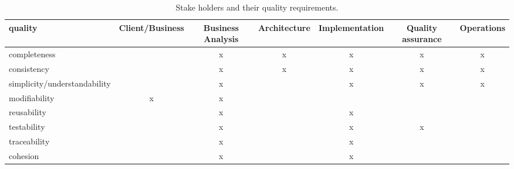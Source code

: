 \begin{table*}[htb]
  \caption{Stake holders and their quality requirements. \label{tab:requirements}}
	{\small
  \begin{tabular}{|l||c|c|c|c|c|c|}
    \hline
	{\bf quality} & Client/Business & Business Analysis & Architecture & Implementation & Quality assurance & Operations \\ \hline
	completeness  &   & x & x & x & x & x \\ \hline
	consistency   &   & x & x & x & x & x \\ \hline
	simplicity/understandability     &   & x &   & x & x & x \\ \hline
	modifiability & x & x &   &   &   &   \\ \hline
	reusability   &   & x &   & x &   &   \\ \hline
	testability   &   & x &   & x & x &   \\ \hline
	traceability  &   & x &   & x &   &   \\ \hline
	cohesion      &   & x &   & x &   &   \\ \hline
  \end{tabular}}
\end{table*}